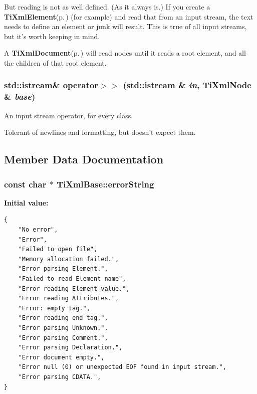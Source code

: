 But reading is not as well defined. (As it always is.) If you create a {\bf Ti\-Xml\-Element}{\rm (p.\,\pageref{classTiXmlElement})} (for example) and read that from an input stream, the text needs to define an element or junk will result. This is true of all input streams, but it's worth keeping in mind.

A {\bf Ti\-Xml\-Document}{\rm (p.\,\pageref{classTiXmlDocument})} will read nodes until it reads a root element, and all the children of that root element.
\subsubsection{\setlength{\rightskip}{0pt plus 5cm}std::istream\& operator$>$$>$ (std::istream \& {\em in}, {\bf Ti\-Xml\-Node} \& {\em base})\hspace{0.3cm}{\tt  [friend, inherited]}}\label{classTiXmlNode_TiXmlUnknownn0}


An input stream operator, for every class. 

Tolerant of newlines and formatting, but doesn't expect them.

\subsection{Member Data Documentation}
\subsubsection{\setlength{\rightskip}{0pt plus 5cm}const char $\ast$ Ti\-Xml\-Base::error\-String\hspace{0.3cm}{\tt  [static, protected, inherited]}}\label{classTiXmlBase_TiXmlUnknownt0}


{\bf Initial value:}

\footnotesize\begin{verbatim}
{
    "No error",
    "Error",
    "Failed to open file",
    "Memory allocation failed.",
    "Error parsing Element.",
    "Failed to read Element name",
    "Error reading Element value.",
    "Error reading Attributes.",
    "Error: empty tag.",
    "Error reading end tag.",
    "Error parsing Unknown.",
    "Error parsing Comment.",
    "Error parsing Declaration.",
    "Error document empty.",
    "Error null (0) or unexpected EOF found in input stream.",
    "Error parsing CDATA.",
}
\end{verbatim}\normalsize 
{}
